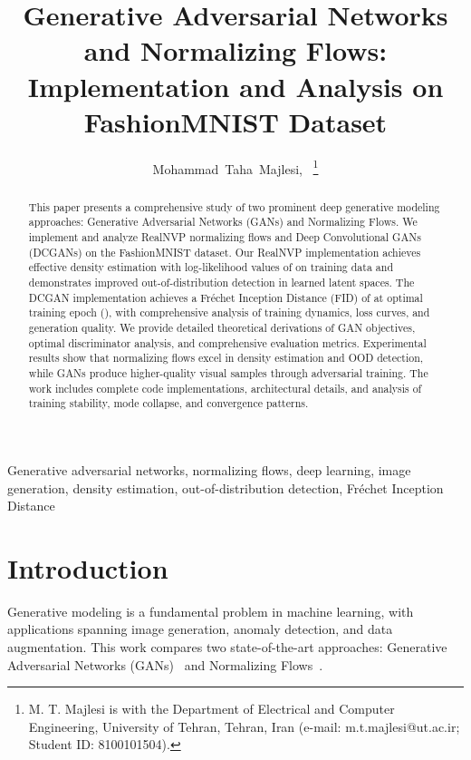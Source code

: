 \documentclass[conference,12pt]{IEEEtran}
\begin{document}
\title{Generative Adversarial Networks and Normalizing Flows:\\
Implementation and Analysis on FashionMNIST Dataset}

\author{Mohammad~Taha~Majlesi,~
\thanks{M. T. Majlesi is with the Department of Electrical and Computer Engineering, University of Tehran, Tehran, Iran (e-mail: m.t.majlesi@ut.ac.ir; Student ID: 8100101504).}}

\maketitle

\begin{abstract}
This paper presents a comprehensive study of two prominent deep generative modeling approaches: Generative Adversarial Networks (GANs) and Normalizing Flows. We implement and analyze RealNVP normalizing flows and Deep Convolutional GANs (DCGANs) on the FashionMNIST dataset. Our RealNVP implementation achieves effective density estimation with log-likelihood values of \PixelTrainLL{} on training data and demonstrates improved out-of-distribution detection in learned latent spaces. The DCGAN implementation achieves a Fréchet Inception Distance (FID) of \BestFID{} at optimal training epoch (\BestFIDEpoch), with comprehensive analysis of training dynamics, loss curves, and generation quality. We provide detailed theoretical derivations of GAN objectives, optimal discriminator analysis, and comprehensive evaluation metrics. Experimental results show that normalizing flows excel in density estimation and OOD detection, while GANs produce higher-quality visual samples through adversarial training. The work includes complete code implementations, architectural details, and analysis of training stability, mode collapse, and convergence patterns.
\end{abstract}

\begin{IEEEkeywords}
Generative adversarial networks, normalizing flows, deep learning, image generation, density estimation, out-of-distribution detection, Fréchet Inception Distance
\end{IEEEkeywords}

\section{Introduction}

Generative modeling is a fundamental problem in machine learning, with applications spanning image generation, anomaly detection, and data augmentation. This work compares two state-of-the-art approaches: Generative Adversarial Networks (GANs)~\cite{goodfellow2014generative} and Normalizing Flows~\cite{dinh2017density}.
\end{document}
